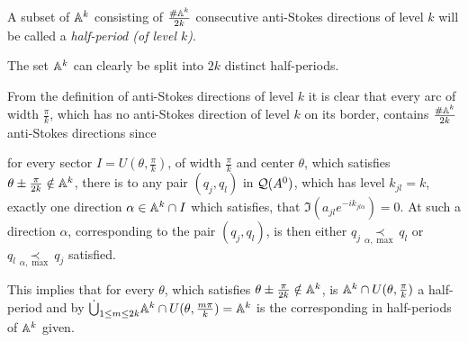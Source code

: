\begin{defn}
  A subset of $\mathbb{A}^k$ consisting of $\frac{\#\mathbb{A}^k}{2k}$ consecutive anti-Stokes
  directions of level $k$ will be called a \emph{half-period (of level $k$)}.
  \begin{s-rem}
    The set $\mathbb{A}^k$ can clearly be split into $2k$ distinct half-periods.
  \end{s-rem}
\end{defn}
From the definition of anti-Stokes directions of level $k$ it is clear that
every arc of width $\frac{\pi}{k}$, which has no anti-Stokes direction of level
$k$ on its border, contains $\frac{\#\mathbb{A}^k}{2k}$ anti-Stokes directions
since
\begin{einr}
  for every sector $I=U(\theta,\frac{\pi}{k})$, of width $\frac{\pi}{k}$ and
  center $\theta$, which satisfies $\theta\pm\frac{\pi}{2k}\notin\mathbb{A}^k$,
  there is to any pair $(q_j,q_l)$ in $\mathcal{Q}(A^0)$, which has level $k_{jl}=k$,
  exactly one direction $\alpha\in \mathbb{A}^k\cap I$ which satisfies, that
  $\Im(a_{jl}e^{-ik_{jl\alpha}})=0$.
  At such a direction $\alpha$, corresponding to the pair $(q_j,q_l)$, is then
  either $q_j\underset{\alpha,\max}{\prec}q_l$ or
  $q_l\underset{\alpha,\max}{\prec}q_j$ satisfied.
\end{einr}
This implies that for every $\theta$, which satisfies
$\theta\pm\frac{\pi}{2k}\notin\mathbb{A}^k$, is $\mathbb{A}^k\cap U(\theta,\frac{\pi}{k})$
a half-period and by
$\dot\bigcup_{1\leq m\leq 2k}\mathbb{A}^k\cap U(\theta,\frac{m\pi}{k})=\mathbb{A}^k$ is the
corresponding  in half-periods of $\mathbb{A}^k$ given.

